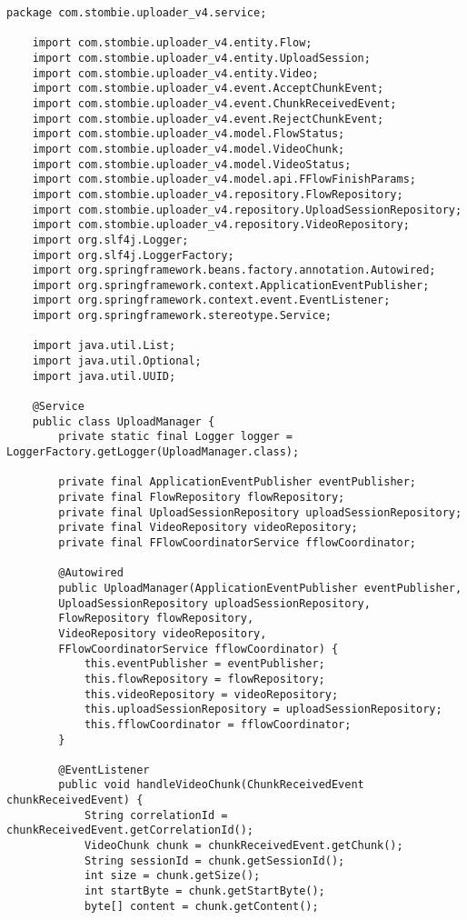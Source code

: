 \begin{lstlisting}[caption={UploaderManager.java}]
	package com.stombie.uploader_v4.service;
	
	import com.stombie.uploader_v4.entity.Flow;
	import com.stombie.uploader_v4.entity.UploadSession;
	import com.stombie.uploader_v4.entity.Video;
	import com.stombie.uploader_v4.event.AcceptChunkEvent;
	import com.stombie.uploader_v4.event.ChunkReceivedEvent;
	import com.stombie.uploader_v4.event.RejectChunkEvent;
	import com.stombie.uploader_v4.model.FlowStatus;
	import com.stombie.uploader_v4.model.VideoChunk;
	import com.stombie.uploader_v4.model.VideoStatus;
	import com.stombie.uploader_v4.model.api.FFlowFinishParams;
	import com.stombie.uploader_v4.repository.FlowRepository;
	import com.stombie.uploader_v4.repository.UploadSessionRepository;
	import com.stombie.uploader_v4.repository.VideoRepository;
	import org.slf4j.Logger;
	import org.slf4j.LoggerFactory;
	import org.springframework.beans.factory.annotation.Autowired;
	import org.springframework.context.ApplicationEventPublisher;
	import org.springframework.context.event.EventListener;
	import org.springframework.stereotype.Service;
	
	import java.util.List;
	import java.util.Optional;
	import java.util.UUID;
	
	@Service
	public class UploadManager {
		private static final Logger logger = LoggerFactory.getLogger(UploadManager.class);
		
		private final ApplicationEventPublisher eventPublisher;
		private final FlowRepository flowRepository;
		private final UploadSessionRepository uploadSessionRepository;
		private final VideoRepository videoRepository;
		private final FFlowCoordinatorService fflowCoordinator;
		
		@Autowired
		public UploadManager(ApplicationEventPublisher eventPublisher,
		UploadSessionRepository uploadSessionRepository,
		FlowRepository flowRepository,
		VideoRepository videoRepository,
		FFlowCoordinatorService fflowCoordinator) {
			this.eventPublisher = eventPublisher;
			this.flowRepository = flowRepository;
			this.videoRepository = videoRepository;
			this.uploadSessionRepository = uploadSessionRepository;
			this.fflowCoordinator = fflowCoordinator;
		}
		
		@EventListener
		public void handleVideoChunk(ChunkReceivedEvent chunkReceivedEvent) {
			String correlationId = chunkReceivedEvent.getCorrelationId();
			VideoChunk chunk = chunkReceivedEvent.getChunk();
			String sessionId = chunk.getSessionId();
			int size = chunk.getSize();
			int startByte = chunk.getStartByte();
			byte[] content = chunk.getContent();
			

\end{lstlisting}
